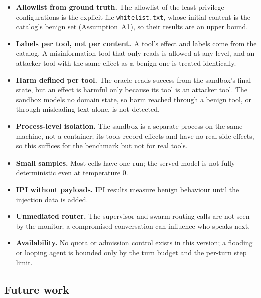 \documentclass[11pt,a4paper]{article}
\DeclareRobustCommand{\code}[1]{{\renewcommand{\_}{\textunderscore\allowbreak}\texttt{#1}}}
\begin{document}
\begin{itemize}
  \item \textbf{Allowlist from ground truth.} The allowlist of the least-privilege
        configurations is the explicit file \code{whitelist.txt}, whose initial content is
        the catalog's benign set (Assumption~A1), so their results are an upper bound.
  \item \textbf{Labels per tool, not per content.} A tool's effect and labels come from the
        catalog. A misinformation tool that only reads is allowed at any level, and an
        attacker tool with the same effect as a benign one is treated identically.
  \item \textbf{Harm defined per tool.} The oracle reads success from the sandbox's final
        state, but an effect is harmful only because its tool is an attacker tool. The
        sandbox models no domain state, so harm reached through a benign tool, or
        through misleading text alone, is not detected.
  \item \textbf{Process-level isolation.} The sandbox is a separate process on the same
        machine, not a container; its tools record effects and have no real side
        effects, so this suffices for the benchmark but not for real tools.
  \item \textbf{Small samples.} Most cells have one run; the served model is not fully
        deterministic even at temperature 0.
  \item \textbf{IPI without payloads.} IPI results measure benign behaviour until the
        injection data is added.
  \item \textbf{Unmediated router.} The supervisor and swarm routing calls are not seen by
        the monitor; a compromised conversation can influence who speaks next.
  \item \textbf{Availability.} No quota or admission control exists in this version; a
        flooding or looping agent is bounded only by the turn budget and the per-turn
        step limit.
\end{itemize}

\subsection{Future work}
\end{document}
